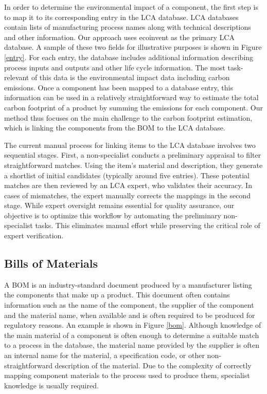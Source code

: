 \documentclass[11pt]{article}
\begin{document}
In order to determine the environmental impact of a component, the first step is to map it to its corresponding entry in the LCA database. LCA databases contain lists of manufacturing process names along with technical descriptions and other information. Our approach uses ecoinvent \cite{ecoinvent} as the primary LCA database. A sample of these two fields for illustrative purposes is shown in Figure \ref{entry}. For each entry, the database includes additional information describing process inputs and outputs and other life cycle information. The most task-relevant of this data is the environmental impact data including carbon emissions. Once a component has been mapped to a database entry, this information can be used in a relatively straightforward way to estimate the total carbon footprint of a product by summing the emissions for each component. Our method thus focuses on the main challenge to the carbon footprint estimation, which is linking the components from the BOM to the LCA database.

The current manual process for linking items to the LCA database involves two sequential stages. First, a non-specialist conducts a preliminary appraisal to filter straightforward matches. Using the item’s material and description, they generate a shortlist of initial candidates (typically around five entries). These potential matches are then reviewed by an LCA expert, who validates their accuracy. In cases of mismatches, the expert manually corrects the mappings in the second stage. While expert oversight remains essential for quality assurance, our objective is to optimize this workflow by automating the preliminary non-specialist tasks. This eliminates manual effort while preserving the critical role of expert verification.



\subsection{Bills of Materials}

A BOM is an industry-standard document produced by a manufacturer listing the components that make up a product. This document often contains information such as the name of the component, the supplier of the component and the material name, when available and is often required to be produced for regulatory reasons. An example is shown in Figure \ref{bom}. Although knowledge of the main material of a component is often enough to determine a suitable match to a process in the database, the material name provided by the supplier is often an internal name for the material, a specification code, or other non-straightforward description of the material.  Due to the complexity of correctly mapping component materials to the process used to produce them, specialist knowledge is usually required.
\end{document}
